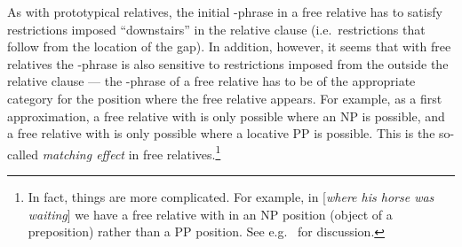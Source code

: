 \documentclass[output=paper
 	        ,biblatex
                ,babelshorthands
                ,newtxmath
                ,draftmode
                ,colorlinks, citecolor=brown
]{langscibook}
\begin{document}
As with prototypical relatives, the initial -phrase in a free relative has to
satisfy restrictions imposed ``downstairs'' in the relative clause (i.e.\ restrictions that
follow from the location of the gap). In addition, however, it seems that with free
relatives the -phrase is also sensitive to restrictions imposed from the
outside the relative clause --- the -phrase of a free relative has to be of the
appropriate category for the position where the free relative appears. For example, as a
first approximation, a free relative with  is only possible where an NP is
possible, and a free relative with  is only possible where a locative PP is
possible. This is the so-called \emph{matching effect} in free relatives.\footnote{In
  fact, things are more complicated. For example, in  [\emph{where his horse
    was waiting}] we have a free relative with  in an NP position (object of a
  preposition) rather than a PP position. See e.g.\  for discussion.}
\end{document}
